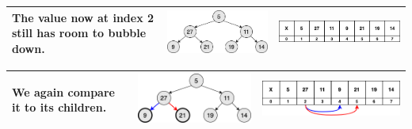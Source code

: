 \begin{center}
	\begin{table}
		\begin{tabular}{| p{}|M{0.30\textwidth}|M{0.35\textwidth}|}
			\hline
			\scriptsize{The value now at index 2 still has room to bubble down.}
			  &   
			\includegraphics[scale=.30]{images/heapify_tree_10.png}
			  &   
			\includegraphics[scale=.30]{images/heapify_10.png}\\
			\hline
		\end{tabular}
	\end{table}
\end{center}


\begin{center}
	\begin{table}
		\begin{tabular}{| p{}|M{0.30\textwidth}|M{0.35\textwidth}|}
			\hline
			\scriptsize{We again compare it to its children.}
			  &   
			\includegraphics[scale=.30]{images/heapify_tree_11.png}
			  &   
			\includegraphics[scale=.30]{images/heapify_11.png}\\
			\hline
		\end{tabular}
	\end{table}
\end{center}


